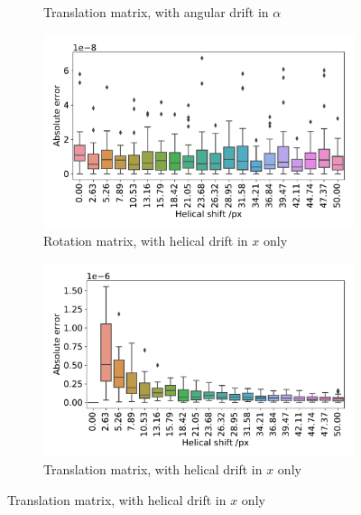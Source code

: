 \documentclass{osa-article}
\begin{document}
\begin{figure}
\begin{subfigure}[t]{0.5\linewidth}
    \caption{Translation matrix, with angular drift in \(\alpha \)}\label{fig:pc_sum_trans_alpha}
  \end{subfigure}
  \par\bigskip
  \begin{subfigure}[t]{0.5\linewidth}
    \captionsetup{width=0.8\linewidth}
    \centering
    \includegraphics[width=\linewidth]{./figures/results/helix/decompose/improved/10082020_bead_simulation_tx_ROT_err}
    \caption{Rotation matrix, with helical drift in \(x\) only}\label{fig:pc_sum_rot_tx}
  \end{subfigure}\hfill
  \begin{subfigure}[t]{0.5\linewidth}
    \captionsetup{width=0.8\linewidth}
    \centering
    \includegraphics[width=\linewidth]{./figures/results/helix/decompose/improved/10082020_bead_simulation_tx_TRANS_err}
    \caption{Translation matrix, with helical drift in \(x\) only}\label{fig:pc_sum_trans_tx}
  \end{subfigure}

\end{figure}
\end{document}
